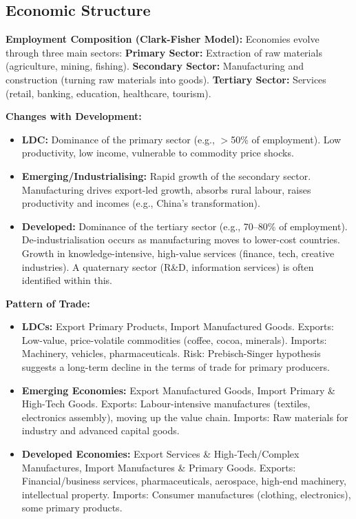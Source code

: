 \documentclass[11pt, a4paper, twoside]{book}
\begin{document}
\subsection{Economic Structure}

\textbf{Employment Composition (Clark-Fisher Model):} Economies evolve through three main sectors: \textbf{Primary Sector:} Extraction of raw materials (agriculture, mining, fishing). \textbf{Secondary Sector:} Manufacturing and construction (turning raw materials into goods). \textbf{Tertiary Sector:} Services (retail, banking, education, healthcare, tourism).

\textbf{Changes with Development:}
\begin{itemize}
  \item \textbf{LDC:} Dominance of the primary sector (e.g., $>$50\% of employment). Low productivity, low income, vulnerable to commodity price shocks.
  \item \textbf{Emerging/Industrialising:} Rapid growth of the secondary sector. Manufacturing drives export-led growth, absorbs rural labour, raises productivity and incomes (e.g., China's transformation).
  \item \textbf{Developed:} Dominance of the tertiary sector (e.g., 70--80\% of employment). De-industrialisation occurs as manufacturing moves to lower-cost countries. Growth in knowledge-intensive, high-value services (finance, tech, creative industries). A quaternary sector (R\&D, information services) is often identified within this.
\end{itemize}

\textbf{Pattern of Trade:}
\begin{itemize}
  \item \textbf{LDCs:} Export Primary Products, Import Manufactured Goods. Exports: Low-value, price-volatile commodities (coffee, cocoa, minerals). Imports: Machinery, vehicles, pharmaceuticals. Risk: Prebisch-Singer hypothesis suggests a long-term decline in the terms of trade for primary producers.
  \item \textbf{Emerging Economies:} Export Manufactured Goods, Import Primary \& High-Tech Goods. Exports: Labour-intensive manufactures (textiles, electronics assembly), moving up the value chain. Imports: Raw materials for industry and advanced capital goods.
  \item \textbf{Developed Economies:} Export Services \& High-Tech/Complex Manufactures, Import Manufactures \& Primary Goods. Exports: Financial/business services, pharmaceuticals, aerospace, high-end machinery, intellectual property. Imports: Consumer manufactures (clothing, electronics), some primary products.
\end{itemize}
\end{document}
